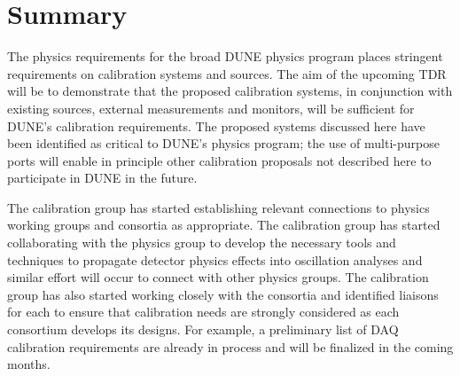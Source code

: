 \section{Summary} %
\label{sec:calibsum}

The physics requirements for the broad DUNE physics program places stringent requirements on calibration systems and sources. The aim of the upcoming TDR will be to demonstrate that the proposed calibration systems, in conjunction with existing sources, external measurements and monitors, will be sufficient for DUNE's calibration requirements. The proposed systems discussed here have been identified as critical to DUNE's physics program; the use of multi-purpose ports will enable  in principle other calibration proposals not described here to participate in DUNE in the future. %

The calibration group has started establishing relevant connections to physics working groups and consortia as appropriate. The calibration group has started collaborating with the \lbl physics group to develop the necessary tools and techniques to propagate detector physics effects into oscillation analyses and similar effort will occur to connect with other physics groups. The calibration group has also started working closely with the consortia and identified liaisons for each 
to ensure that calibration needs are strongly considered as each consortium develops its designs. For example, a preliminary list of DAQ calibration requirements are already in process and  will be finalized in the coming months.





